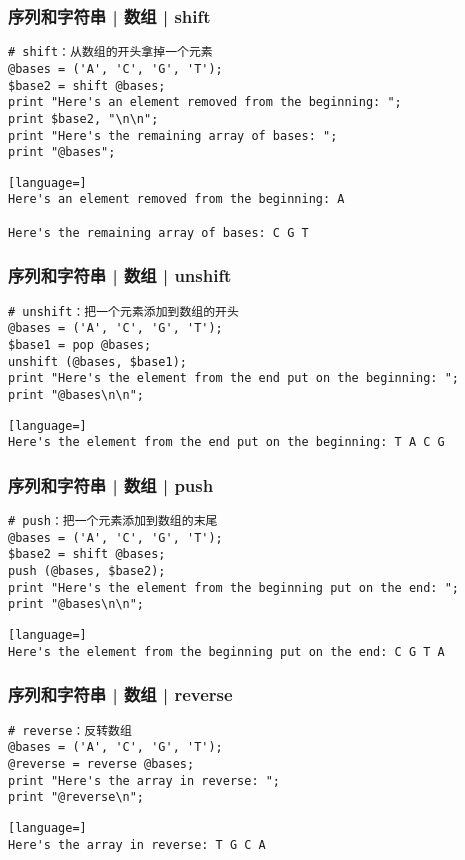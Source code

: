 \begin{frame}[fragile]
  \frametitle{序列和字符串 | 数组 | \alert{shift}}
\begin{lstlisting}
# shift：从数组的开头拿掉一个元素
@bases = ('A', 'C', 'G', 'T');
$base2 = shift @bases;
print "Here's an element removed from the beginning: ";
print $base2, "\n\n";
print "Here's the remaining array of bases: ";
print "@bases";
\end{lstlisting}
\pause
\begin{lstlisting}[language=]
Here's an element removed from the beginning: A

Here's the remaining array of bases: C G T
\end{lstlisting}
\end{frame}

\begin{frame}[fragile]
  \frametitle{序列和字符串 | 数组 | \alert{unshift}}
\begin{lstlisting}
# unshift：把一个元素添加到数组的开头
@bases = ('A', 'C', 'G', 'T');
$base1 = pop @bases;
unshift (@bases, $base1);
print "Here's the element from the end put on the beginning: ";
print "@bases\n\n";
\end{lstlisting}
\pause
\begin{lstlisting}[language=]
Here's the element from the end put on the beginning: T A C G
\end{lstlisting}
\end{frame}

\begin{frame}[fragile]
  \frametitle{序列和字符串 | 数组 | \alert{push}}
\begin{lstlisting}
# push：把一个元素添加到数组的末尾
@bases = ('A', 'C', 'G', 'T');
$base2 = shift @bases;
push (@bases, $base2);
print "Here's the element from the beginning put on the end: ";
print "@bases\n\n";
\end{lstlisting}
\pause
\begin{lstlisting}[language=]
Here's the element from the beginning put on the end: C G T A
\end{lstlisting}
\end{frame}

\begin{frame}[fragile]
  \frametitle{序列和字符串 | 数组 | \alert{reverse}}
\begin{lstlisting}
# reverse：反转数组
@bases = ('A', 'C', 'G', 'T');
@reverse = reverse @bases;
print "Here's the array in reverse: ";
print "@reverse\n";
\end{lstlisting}
\pause
\begin{lstlisting}[language=]
Here's the array in reverse: T G C A
\end{lstlisting}
\end{frame}

